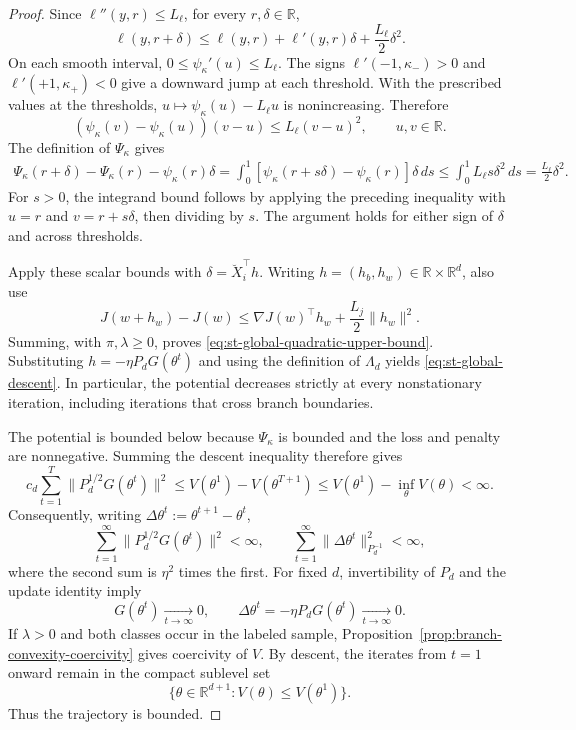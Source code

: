 \begin{proof}
Since $\ell''(y,r)\leq L_\ell$, for every $r,\delta\in\mathbb R$,
\[
    \ell(y,r+\delta)
    \leq
    \ell(y,r)+\ell'(y,r)\delta+\frac{L_\ell}{2}\delta^2.
\]
On each smooth interval,
$0\leq\psi_\kappa'(u)\leq L_\ell$.
The signs
$\ell'(-1,\kappa_-)>0$ and $\ell'(+1,\kappa_+)<0$
give a downward jump at each threshold.
With the prescribed values at the thresholds,
$u\mapsto\psi_\kappa(u)-L_\ell u$ is nonincreasing.
Therefore
\[
    (\psi_\kappa(v)-\psi_\kappa(u))(v-u)
    \leq L_\ell(v-u)^2,
    \qquad u,v\in\mathbb R.
\]
The definition of $\Psi_\kappa$ gives
\begin{align*}
    \Psi_\kappa(r+\delta)-\Psi_\kappa(r)
        -\psi_\kappa(r)\delta
    =
    \int_0^1[\psi_\kappa(r+s\delta)-\psi_\kappa(r)]
        \delta\,ds
    \leq
    \int_0^1L_\ell s\delta^2\,ds
    =
    \frac{L_\ell}{2}\delta^2.
\end{align*}
For $s>0$, the integrand bound follows by applying the preceding
inequality with $u=r$ and $v=r+s\delta$, then dividing by $s$.
The argument holds for either sign of $\delta$ and across thresholds.

Apply these scalar bounds with $\delta=\breve X_i^\top h$.
Writing $h=(h_b,h_w)\in\mathbb R\times\mathbb R^d$, also use
\[
    J(w+h_w)-J(w)
    \leq
    \nabla J(w)^\top h_w+\frac{L_j}{2}\|h_w\|^2.
\]
Summing, with $\pi,\lambda\geq0$, proves
\eqref{eq:st-global-quadratic-upper-bound}.
Substituting $h=-\eta P_dG(\theta^t)$ and using the definition of
$\Lambda_d$ yields \eqref{eq:st-global-descent}.
In particular, the potential decreases strictly at every
nonstationary iteration, including iterations that cross
branch boundaries.

The potential is bounded below because $\Psi_\kappa$ is bounded
and the loss and penalty are nonnegative.
Summing the descent inequality therefore gives
\[
    c_d\sum_{t=1}^T\|P_d^{1/2}G(\theta^t)\|^2
    \leq V(\theta^1)-V(\theta^{T+1})
    \leq V(\theta^1)-\inf_\theta V(\theta)<\infty.
\]
Consequently, writing
$\Delta\theta^t:=\theta^{t+1}-\theta^t$,
\begin{equation}
    \sum_{t=1}^\infty\|P_d^{1/2}G(\theta^t)\|^2<\infty,
    \qquad
    \sum_{t=1}^\infty\|\Delta\theta^t\|_{P_d^{-1}}^2<\infty,
    \label{eq:st-square-summable-updates}
\end{equation}
where the second sum is $\eta^2$ times the first.
For fixed $d$, invertibility of $P_d$ and the update identity imply
\begin{equation}
    G(\theta^t)\xrightarrow[t\to\infty]{}0,
    \qquad
    \Delta\theta^t=-\eta P_dG(\theta^t)
        \xrightarrow[t\to\infty]{}0.
    \label{eq:parameter-difference-converges-to-zero}
\end{equation}
If $\lambda>0$ and both classes occur in the labeled sample,
Proposition~\ref{prop:branch-convexity-coercivity} gives coercivity
of $V$. By descent, the iterates from $t=1$ onward remain in
the compact sublevel set
\[
    \{\theta\in\mathbb R^{d+1}:V(\theta)\leq V(\theta^1)\}.
\]
Thus the trajectory is bounded.
\end{proof}

